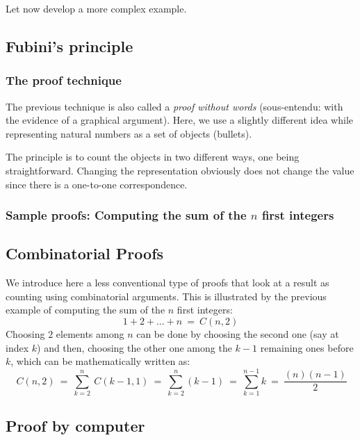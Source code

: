 Let now develop a more complex example.



\subsection{Fubini's principle}
\label{sec:Fubini}


\subsubsection{The proof technique}

The previous technique is also called a \textit{proof without words}
(sous-entendu: with the evidence of a graphical argument).
Here, we use a slightly different idea while representing natural numbers as a set of objects (bullets).

The principle is to count the objects in two different ways, one being straightforward.
Changing the representation obviously does not change the value
since there is a one-to-one correspondence.


\subsubsection{Sample proofs: Computing the sum of the $n$ first integers}




\subsection{Combinatorial Proofs}

We introduce here a less conventional type of proofs that look at a result
as counting using combinatorial arguments.
This is illustrated by the previous example of computing the sum of the $n$ first integers:
\[ 1+2+ \ldots + n \ = \ C(n,2)  \]
Choosing $2$ elements among $n$ can be done by choosing the second one (say at index $k$)
and then, choosing the other one among the $k-1$ remaining ones before $k$, 
which can be mathematically written as:
\[ \ C(n,2) \ = \  \sum_{k=2}^n  \ C(k-1,1)\ = \  \sum_{k=2}^n  (k-1) \ = \  \sum_{k=1}^{n-1}  k \ = \ \frac{(n)(n-1)}{2}\]



\subsection{Proof by computer}


